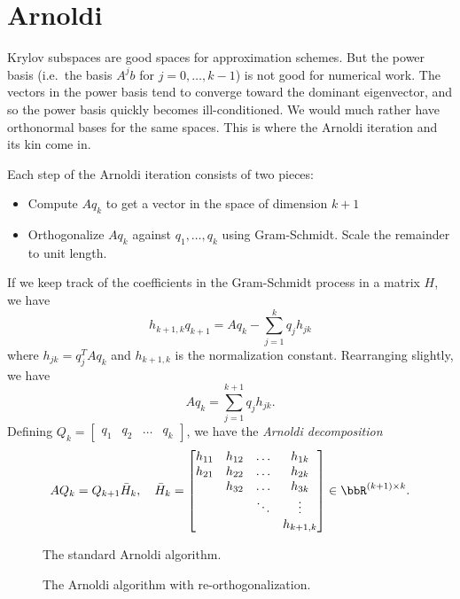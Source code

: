 \section{Arnoldi}

Krylov subspaces are good spaces for approximation schemes.  But the
power basis (i.e.~the basis $A^j b$ for $j = 0, \ldots, k-1$) is not
good for numerical work.  The vectors in the power basis tend to
converge toward the dominant eigenvector, and so the power basis quickly
becomes ill-conditioned.  We would much rather have orthonormal bases
for the same spaces.  This is where the Arnoldi iteration and its kin
come in.

Each step of the Arnoldi iteration consists of two pieces:
\begin{itemize}
\item
  Compute $Aq_k$ to get a vector in the space of dimension $k+1$
\item
  Orthogonalize $Aq_k$ against $q_1, \ldots, q_k$ using Gram-Schmidt.
  Scale the remainder to unit length.
\end{itemize}
If we keep track of the coefficients in the Gram-Schmidt process
in a matrix $H$, we have
\[
  h_{k+1,k} q_{k+1} = Aq_k - \sum_{j=1}^{k} q_j h_{jk}
\]
where $h_{jk} = q_j^T A q_k$ and $h_{k+1,k}$ is the normalization
constant.  Rearranging slightly, we have
\[
  Aq_k = \sum_{j=1}^{k+1} q_j h_{jk}.
\]
Defining $Q_k = \begin{bmatrix} q_1 & q_2 & \ldots & q_k \end{bmatrix}$,
we have the {\em Arnoldi decomposition}
\[
  AQ_k = Q_{k+1} \bar{H}_k, \quad
  \bar{H}_k =
  \begin{bmatrix}
    h_{11} & h_{12} & \ldots & h_{1k} \\
    h_{21} & h_{22} & \ldots & h_{2k} \\
           & h_{32} & \ldots & h_{3k} \\
           &        & \ddots & \vdots \\
           &        &        & h_{k+1,k}
  \end{bmatrix} \in \bbR^{(k+1) \times k}.
\]
\begin{figure}

\caption{The standard Arnoldi algorithm.}
\label{arnoldi-1}
\end{figure}

\begin{figure}

\caption{The Arnoldi algorithm with re-orthogonalization.}
\label{arnoldi-2}
\end{figure}

